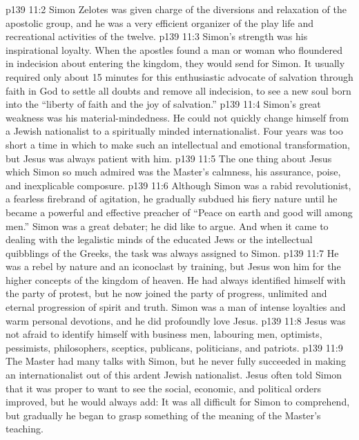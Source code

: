 \vs p139 11:2 \pc Simon Zelotes was given charge of the diversions and relaxation of the apostolic group, and he was a very efficient organizer of the play life and recreational activities of the twelve.
\vs p139 11:3 Simon’s strength was his inspirational loyalty. When the apostles found a man or woman who floundered in indecision about entering the kingdom, they would send for Simon. It usually required only about 15 minutes for this enthusiastic advocate of salvation through faith in God to settle all doubts and remove all indecision, to see a new soul born into the “liberty of faith and the joy of salvation.”
\vs p139 11:4 Simon’s great weakness was his material\hyp{}mindedness. He could not quickly change himself from a Jewish nationalist to a spiritually minded internationalist. Four years was too short a time in which to make such an intellectual and emotional transformation, but Jesus was always patient with him.
\vs p139 11:5 \pc The one thing about Jesus which Simon so much admired was the Master’s calmness, his assurance, poise, and inexplicable composure.
\vs p139 11:6 \pc Although Simon was a rabid revolutionist, a fearless firebrand of agitation, he gradually subdued his fiery nature until he became a powerful and effective preacher of “Peace on earth and good will among men.” Simon was a great debater; he did like to argue. And when it came to dealing with the legalistic minds of the educated Jews or the intellectual quibblings of the Greeks, the task was always assigned to Simon.
\vs p139 11:7 He was a rebel by nature and an iconoclast by training, but Jesus won him for the higher concepts of the kingdom of heaven. He had always identified himself with the party of protest, but he now joined the party of progress, unlimited and eternal progression of spirit and truth. Simon was a man of intense loyalties and warm personal devotions, and he did profoundly love Jesus.
\vs p139 11:8 \pc Jesus was not afraid to identify himself with business men, labouring men, optimists, pessimists, philosophers, sceptics, publicans, politicians, and patriots.
\vs p139 11:9 \pc The Master had many talks with Simon, but he never fully succeeded in making an internationalist out of this ardent Jewish nationalist. Jesus often told Simon that it was proper to want to see the social, economic, and political orders improved, but he would always add:  It was all difficult for Simon to comprehend, but gradually he began to grasp something of the meaning of the Master’s teaching.

